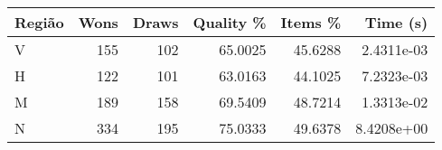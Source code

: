 \begin{tabular}{lrrrrr}
\hline
Região & Wons & Draws & Quality \% & Items \% & Time (s)   \\
\hline
V      & 155  & 102   & 65.0025    & 45.6288  & 2.4311e-03 \\
H      & 122  & 101   & 63.0163    & 44.1025  & 7.2323e-03 \\
M      & 189  & 158   & 69.5409    & 48.7214  & 1.3313e-02 \\
N      & 334  & 195   & 75.0333    & 49.6378  & 8.4208e+00 \\
\hline
\end{tabular}